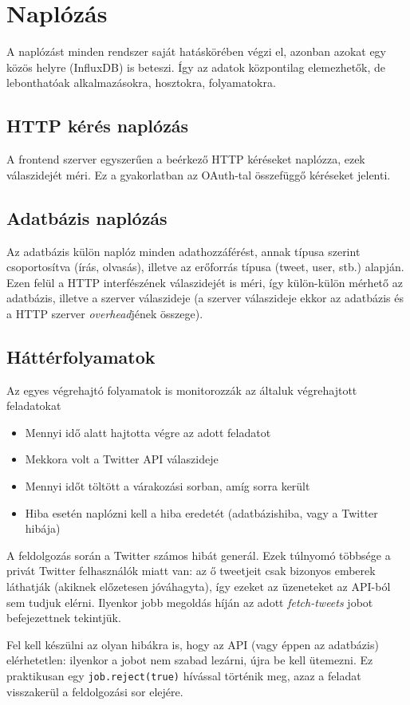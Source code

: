 \section{Naplózás}

A naplózást minden rendszer saját hatáskörében végzi el, azonban azokat
egy közös helyre (InfluxDB) is beteszi. Így az adatok központilag elemezhetők,
de lebonthatóak alkalmazásokra, hosztokra, folyamatokra.

\subsection{HTTP kérés naplózás}

A frontend szerver egyszerűen a beérkező HTTP kéréseket naplózza, ezek
válaszidejét méri. Ez a gyakorlatban az OAuth-tal összefüggő kéréseket
jelenti.

\subsection{Adatbázis naplózás}

Az adatbázis külön naplóz minden adathozzáférést, annak típusa szerint
csoportosítva (írás, olvasás), illetve az erőforrás típusa (tweet, user, stb.)
alapján. Ezen felül a HTTP interfészének válaszidejét is méri, így
külön-külön mérhető az adatbázis, illetve a szerver válaszideje
(a szerver válaszideje ekkor az adatbázis és a
HTTP szerver \emph{overhead}jének összege).

\subsection{Háttérfolyamatok}

Az egyes végrehajtó folyamatok is monitorozzák az általuk végrehajtott
feladatokat

\begin{itemize}
  \item Mennyi idő alatt hajtotta végre az adott feladatot
  \item Mekkora volt a Twitter API válaszideje
  \item Mennyi időt töltött a várakozási sorban, amíg sorra került
  \item Hiba esetén naplózni kell a hiba eredetét (adatbázishiba,
    vagy a Twitter hibája)
\end{itemize}

A feldolgozás során a Twitter számos hibát generál. Ezek túlnyomó többsége
a privát Twitter felhasználók miatt van: az ő tweetjeit csak bizonyos
emberek láthatják (akiknek előzetesen jóváhagyta), így ezeket az üzeneteket
az API-ból sem tudjuk elérni. Ilyenkor jobb megoldás híján az adott
\emph{fetch-tweets} jobot befejezettnek tekintjük.

Fel kell készülni az olyan hibákra is, hogy az API (vagy éppen az adatbázis)
elérhetetlen: ilyenkor a jobot nem szabad lezárni, újra be kell ütemezni.
Ez praktikusan egy \verb=job.reject(true)= hívással történik meg, azaz
a feladat visszakerül a feldolgozási sor elejére.
